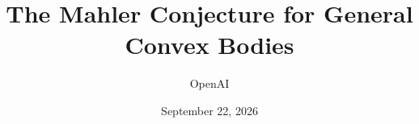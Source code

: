 \documentclass[11pt]{article}
\title{The Mahler Conjecture for General Convex Bodies}
\author{OpenAI}
\date{September 22, 2026}
\theoremstyle{definition}
\theoremstyle{remark}
\begin{document}
\maketitle
\begin{abstract}

\end{abstract}

\tableofcontents







\appendix




\end{document}
